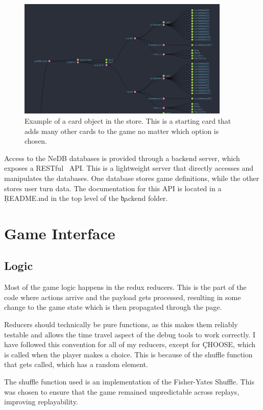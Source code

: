 \begin{figure}[!h]
	\centering
	\includegraphics[width=0.9\textwidth]{./images/design/card_example.png}
	\caption{Example of a card object in the store. This is a starting card that adds many other cards to the game no matter which option is chosen.}
	\label{fig:card_example}
\end{figure}

Access to the NeDB databases is provided through a backend server, which exposes a RESTful~\cite{REST} API. This is a lightweight server that directly accesses and manipulates the databases. One database stores game definitions, while the other stores user turn data.
The documentation for this API is located in a \c{README.md} in the top level of the \c{backend} folder.

\section{Game Interface}
\subsection{Logic}
Most of the game logic happens in the redux reducers. 
This is the part of the code where actions arrive and the payload gets processed, resulting in some change to the game state which is then propagated through the page.

Reducers should technically be pure functions, as this makes them reliably testable and allows the time travel aspect of the debug tools to work correctly. 
I have followed this convention for all of my reducers, except for \c{CHOOSE}, which is called when the player makes a choice. 
This is because of the shuffle function that gets called, which has a random element.

The shuffle function used is an implementation of the Fisher-Yates Shuffle\cite{Shuffle}. 
This was chosen to ensure that the game remained unpredictable across replays, improving replayability.


